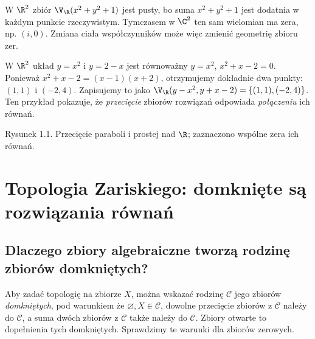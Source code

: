 \begin{przyklad}
W $\R^2$ zbiór $\V_{\R}(x^2+y^2+1)$ jest pusty, bo suma
$x^2+y^2+1$ jest dodatnia w każdym punkcie rzeczywistym.
Tymczasem w $\C^2$ ten sam wielomian ma zera, np. $(i,0)$.
Zmiana ciała współczynników może więc zmienić geometrię zbioru zer.
\end{przyklad}

\begin{przyklad}
W $\R^2$ układ $y=x^2$ i $y=2-x$ jest równoważny
$y=x^2$, $x^2+x-2=0$. Ponieważ
$x^2+x-2=(x-1)(x+2)$, otrzymujemy dokładnie dwa punkty:
$(1,1)$ i $(-2,4)$. Zapisujemy to jako
$\V_{\R}(y-x^2,y+x-2)=\{(1,1),(-2,4)\}$.
Ten przykład pokazuje, że \emph{przecięcie} zbiorów rozwiązań odpowiada
\emph{połączeniu} ich równań.
\end{przyklad}

\begin{center}
\end{center}
\begin{center}\small Rysunek 1.1. Przecięcie paraboli i prostej nad $\R$; zaznaczono wspólne zera ich równań.\end{center}

\section{Topologia Zariskiego: domknięte są rozwiązania równań}

\subsection{Dlaczego zbiory algebraiczne tworzą rodzinę zbiorów domkniętych?}

Aby zadać topologię na zbiorze $X$, można wskazać rodzinę
$\mathcal C$ jego zbiorów \emph{domkniętych}, pod warunkiem że
$\varnothing,X\in\mathcal C$, dowolne przecięcie zbiorów z
$\mathcal C$ należy do $\mathcal C$, a suma dwóch zbiorów z
$\mathcal C$ także należy do $\mathcal C$. Zbiory otwarte to dopełnienia
tych domkniętych. Sprawdzimy te warunki dla zbiorów zerowych.

